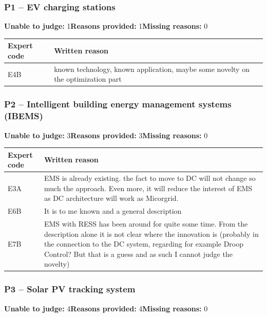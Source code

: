 
\subsubsection*{P1 -- EV charging stations}
\noindent \textbf{Unable to judge:} 1\quad \textbf{Reasons provided:} 1\quad \textbf{Missing reasons:} 0

\begin{tabularx}{\linewidth}{@{}lX@{}}
\toprule
Expert code & Written reason \\
\midrule
E4B & known technology, known application, maybe some novelty on the optimization part \\
\bottomrule
\end{tabularx}

\medskip

\subsubsection*{P2 -- Intelligent building energy management systems (IBEMS)}
\noindent \textbf{Unable to judge:} 3\quad \textbf{Reasons provided:} 3\quad \textbf{Missing reasons:} 0

\begin{tabularx}{\linewidth}{@{}lX@{}}
\toprule
Expert code & Written reason \\
\midrule
E3A & EMS is already existing. the fact to move to DC will not change so much the approach. Even more, it will reduce the interest of EMS as DC architecture will work as Micorgrid. \\
E6B & It is to me known and a general description \\
E7B & EMS with RESS has been around for quite some time. From the description alone it is not clear where the innovation is (probably in the connection to the DC system, regarding for example Droop Control? But that is a guess and as such I cannot judge the novelty) \\
\bottomrule
\end{tabularx}

\medskip

\subsubsection*{P3 -- Solar PV tracking system}
\noindent \textbf{Unable to judge:} 4\quad \textbf{Reasons provided:} 4\quad \textbf{Missing reasons:} 0

